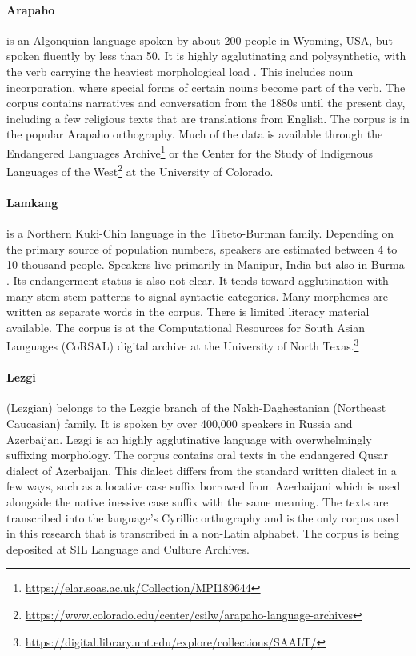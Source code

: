 \paragraph{Arapaho}
is an Algonquian language spoken by about 200 people in Wyoming, USA, but spoken fluently by less than 50. It is highly agglutinating and polysynthetic, with the verb carrying the heaviest morphological load \citep{cowell_arapaho_2008}. This includes noun incorporation, where special forms of certain nouns become part of the verb. The corpus contains narratives and conversation from the 1880s until the present day, including a few religious texts that are translations from English. The corpus is in the popular Arapaho orthography. Much of the data is available through the Endangered Languages Archive\footnote{\url{https://elar.soas.ac.uk/Collection/MPI189644}} or the Center for the Study of Indigenous Languages of the West\footnote{\url{https://www.colorado.edu/center/csilw/arapaho-language-archives}} at the University of Colorado.

\paragraph{Lamkang} 
is a Northern Kuki-Chin language in the Tibeto-Burman family. Depending on the primary source of population numbers, speakers are estimated between 4 to 10 thousand people. Speakers live primarily in Manipur, India but also in Burma \citep{lamkang_2007}. Its endangerment status is also not clear. It tends toward agglutination with many stem-stem patterns to signal syntactic categories. Many morphemes are written as separate words in the corpus. There is limited literacy material available. The corpus is at the Computational Resources for South Asian Languages (CoRSAL) digital archive at the University of North Texas.\footnote{\url{https://digital.library.unt.edu/explore/collections/SAALT/}}

\paragraph{Lezgi} 
(Lezgian) belongs to the Lezgic branch of the Nakh-Daghestanian (Northeast Caucasian) family. It is spoken by over 400,000 speakers in Russia and Azerbaijan. Lezgi is an highly agglutinative language with overwhelmingly suffixing morphology. The corpus contains oral texts in the endangered Qusar dialect of Azerbaijan. This dialect differs from the standard written dialect in a few ways, such as a locative case suffix borrowed from Azerbaijani which is used alongside the native inessive case suffix with the same meaning. The texts are transcribed into the language's Cyrillic orthography and is the only corpus used in this research that is transcribed in a non-Latin alphabet. The corpus is being deposited at SIL Language and Culture Archives.

